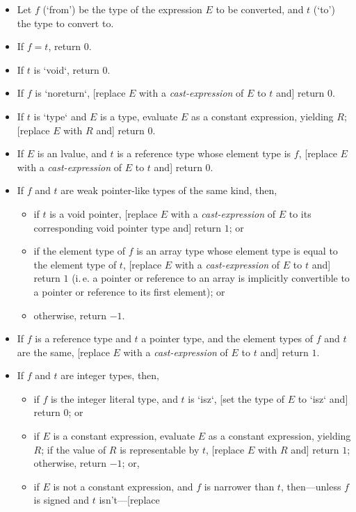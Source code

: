 \documentclass[a4paper, 12pt, oneside, final]{article}
\begin{document}
\begin{itemize}
    \item Let $f$ (‘from’) be the type of the expression $E$ to be converted, and $t$ (‘to’) the type to convert to.
    \item If $f = t$, return $0$.
    \item If $t$ is `void`, return $0$.
    \item If $f$ is `noreturn`, [replace $E$ with a \emph{cast-expression} of $E$ to $t$ and] return $0$.
    \item If $t$ is `type` and $E$ is a type, evaluate $E$ as a constant expression, yielding $R$; [replace $E$ with $R$ and]
          return $0$.
    \item If $E$ is an lvalue, and $t$ is a reference type whose element type is $f$, [replace $E$ with a \emph{cast-expression}
          of $E$ to $t$ and] return $0$.
    \item If $f$ and $t$ are weak pointer-like types of the same kind, then,
    \begin{itemize}
        \item if $t$ is a void pointer, [replace $E$ with a \emph{cast-expression} of $E$ to its corresponding void pointer type and] return $1$; or
        \item if the element type of $f$ is an array type whose element type is equal to the element type of $t$,
              [replace $E$ with a \emph{cast-expression} of $E$ to $t$ and] return $1$ (i.\,e. a pointer or reference to an
              array is implicitly convertible to a pointer or reference to its first element); or
        \item otherwise, return $-1$.
    \end{itemize}
    \item If $f$ is a reference type and $t$ a pointer type, and the element types of $f$ and $t$ are the same, [replace $E$ with a
          \emph{cast-expression} of $E$ to $t$ and] return $1$.
    \item If $f$ and $t$ are integer types, then,
    \begin{itemize}
        \item if $f$ is the integer literal type, and $t$ is `isz`, [set the type of $E$ to `isz` and] return $0$; or
        \item if $E$ is a constant expression, evaluate $E$ as a constant expression, yielding $R$; if the value of $R$
              is representable by $t$, [replace $E$ with $R$ and] return $1$; otherwise, return $-1$; or,
        \item if $E$ is not a constant expression, and $f$ is narrower than $t$, then—unless $f$ is signed and $t$ isn’t—[replace

\end{itemize}
\end{itemize}
\end{document}
